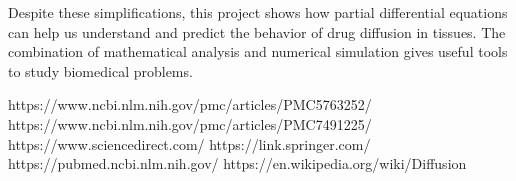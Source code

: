 \documentclass[11pt, a4paper]{article}
\begin{document}
Despite these simplifications, this project shows how partial differential equations can help us understand and predict the behavior of drug diffusion in tissues.
The combination of mathematical analysis and numerical simulation gives useful tools to study biomedical problems.

\begin{thebibliography}{9}
 https://www.ncbi.nlm.nih.gov/pmc/articles/PMC5763252/
 https://www.ncbi.nlm.nih.gov/pmc/articles/PMC7491225/
 https://www.sciencedirect.com/
 https://link.springer.com/
 https://pubmed.ncbi.nlm.nih.gov/
 https://en.wikipedia.org/wiki/Diffusion
\end{thebibliography}
\end{document}
